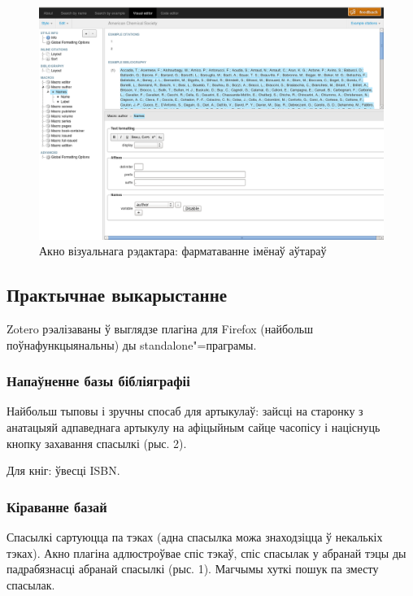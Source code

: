 \documentclass[10pt, a5paper]{article}
\begin{document}
\begin{figure}[h!]
  \centering
  \includegraphics[scale=0.2]{11_2014_screen_editor.png}
  \caption{Акно візуальнага рэдактара: фарматаванне імёнаў аўтараў}
\end{figure}

\subsection*{Практычнае выкарыстанне}

Zotero рэалізаваны ў выглядзе плагіна для Firefox (найбольш поўнафункцыянальны) ды standalone"=праграмы.

\subsubsection*{Напаўненне базы бібліяграфіі}

Найбольш тыповы і зручны спосаб для артыкулаў: зайсці на старонку з анатацыяй адпаведнага артыкулу на афіцыйным сайце часопісу і націснуць кнопку захавання спасылкі (рыс. 2).

Для кніг: ўвесці ISBN.

\subsubsection*{Кіраванне базай}

Спасылкі сартуюцца па тэках (адна спасылка можа знаходзіцца ў некалькіх тэках). Акно плагіна адлюстроўвае спіс тэкаў, спіс спасылак у абранай тэцы ды падрабязнасці абранай спасылкі (рыс. 1). Магчымы хуткі пошук па зместу спасылак.
\end{document}
